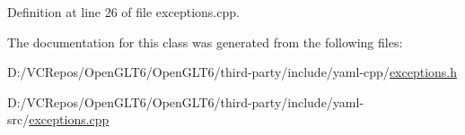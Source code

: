 Definition at line 26 of file exceptions.\+cpp.



The documentation for this class was generated from the following files\+:\begin{DoxyCompactItemize}
\item 
D\+:/\+V\+C\+Repos/\+Open\+G\+L\+T6/\+Open\+G\+L\+T6/third-\/party/include/yaml-\/cpp/\mbox{\hyperlink{exceptions_8h}{exceptions.\+h}}\item 
D\+:/\+V\+C\+Repos/\+Open\+G\+L\+T6/\+Open\+G\+L\+T6/third-\/party/include/yaml-\/src/\mbox{\hyperlink{exceptions_8cpp}{exceptions.\+cpp}}\end{DoxyCompactItemize}
